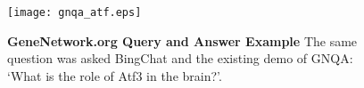 \begin{figure}[h] %
	\centering
	\texttt{[image: gnqa\_atf.eps]}
	\caption{ \textbf{GeneNetwork.org Query and Answer Example}
    The same question was asked BingChat and the existing demo of GNQA: `What is the role of Atf3 in the brain?'. 
            }
        \label{fig:gnqa_atf}
\end{figure}
